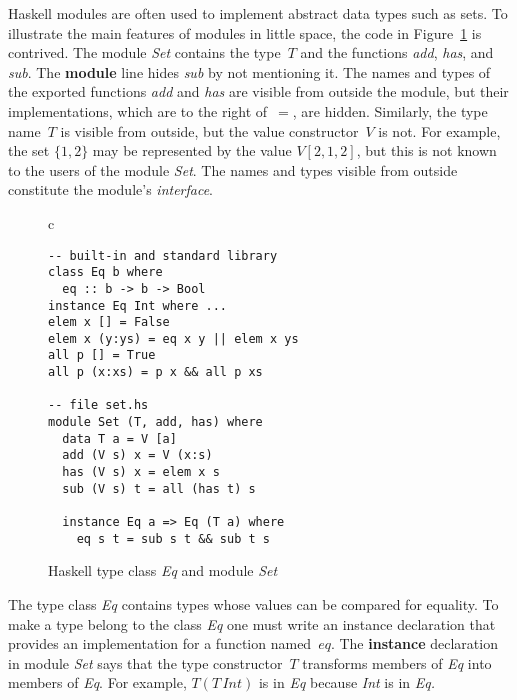 \documentclass[conference,compsoc]{IEEEtran} %
\begin{document}

Haskell modules are often used to implement abstract data types such as
sets.  To illustrate the main features of modules in little space, the code
in Figure~\ref{fig:haskell} is contrived.  The module \textit{Set} contains
the type~$T$ and the functions \textit{add}, \textit{has}, and
\textit{sub}. The \textbf{module} line hides \textit{sub} by not mentioning
it. The names and types of the exported functions \textit{add} and
\textit{has} are visible from outside the module, but their
implementations, which are to the right of~$=$, are hidden.  Similarly, the
type name~$T$ is visible from outside, but the value constructor~$V$ is
not. For example, the set $\{1,2\}$ may be represented by the value
$V[2,1,2]$, but this is not known to the users of the module \textit{Set}.
The names and types visible from outside constitute the module's
\emph{interface}.

\begin{figure}\footnotesize %
\begin{center}
\begin{tabular}{c}
\begin{lstlisting}[style=hs]
-- built-in and standard library
class Eq b where
  eq :: b -> b -> Bool
instance Eq Int where ...
elem x [] = False
elem x (y:ys) = eq x y || elem x ys
all p [] = True
all p (x:xs) = p x && all p xs

-- file set.hs
module Set (T, add, has) where
  data T a = V [a]
  add (V s) x = V (x:s)
  has (V s) x = elem x s
  sub (V s) t = all (has t) s

  instance Eq a => Eq (T a) where
    eq s t = sub s t && sub t s
\end{lstlisting}
\end{tabular}
\end{center}
\caption{Haskell type class \textit{Eq} and module \textit{Set}}
\label{fig:haskell}
\end{figure} %


The type class \textit{Eq} contains types whose values can be compared for
equality. To make a type belong to the class \textit{Eq} one must write an
instance declaration that provides an implementation for a function
named~$eq$. The \textbf{instance} declaration in module \textit{Set} says
that the type constructor~$T$ transforms members of \textit{Eq} into
members of \textit{Eq}. For example, $T(T\,\mathit{Int})$ is in \textit{Eq}
because \textit{Int} is in \textit{Eq.}
\end{document}
